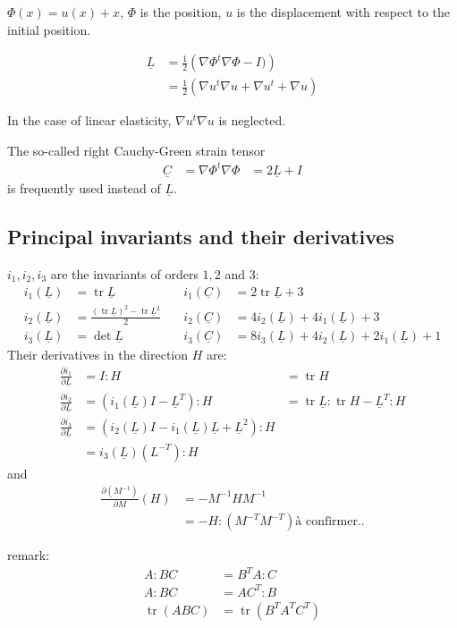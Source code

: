 \documentclass{article}
\newcommand{\TL}{\ensuremath{\underline{L}}}
\newcommand{\TC}{\ensuremath{\underline{C}}}
\newcommand{\DU}{\ensuremath{\nabla u}}
\newcommand{\DUt}{\ensuremath{\nabla u^t}}
\DeclareMathOperator{\Det}{det}
\DeclareMathOperator{\Trace}{tr}
\begin{document}
$\Phi(x) = u(x) + x$, $\Phi$ is the position, $u$ is the displacement with respect to the initial position.

\begin{align}
\TL &= \frac{1}{2}\left(\nabla\Phi^t\nabla\Phi - I)\right)\\
&= \frac{1}{2}\left(\DUt\DU + \DUt + \DU\right)
\end{align}

In the case of linear elasticity, $\DUt\DU$ is neglected.

The so-called right Cauchy-Green strain tensor
\begin{align}
\TC &= \nabla\Phi^t\nabla\Phi &= 2\TL + I
\end{align}
is frequently used instead of $\TL$.

\subsection{Principal invariants and their derivatives}
$i_1,i_2,i_3$ are the invariants of orders $1,2$ and $3$:
\begin{align}
  i_1(\TL) &= \Trace\TL &i_1(\TC) &= 2\Trace\TL + 3\\
  i_2(\TL) &= \frac{(\Trace\TL)^2 - \Trace\TL^2}{2}\quad& i_2(\TC)&=4i_2(\TL)+4i_1(\TL)+3\\
  i_3(\TL) &= \Det\TL &i_3(\TC) &= 8i_3(\TL) + 4i_2(\TL) + 2i_1(\TL) + 1
\end{align}
Their derivatives in the direction $H$ are:
\begin{align}
  \frac{\partial i_1}{\partial\TL} &= I:H &= \Trace H\\
  \frac{\partial i_2}{\partial\TL} &= (i_1(\TL)I - \TL^T):H &= \Trace \TL:\Trace H - \TL^T:H\\
  \frac{\partial i_3}{\partial\TL} &= (i_2(\TL)I - i_1(\TL)\TL + \TL^2):H \\
                  &= i_3(\TL)(L^{-T}):H
\end{align}
and
\begin{align}
\frac{\partial (M^{-1})}{\partial M}(H) &= -M^{-1}HM^{-1}\\
 &= -H:(M^{-T}M^{-T}) \textrm{\`a confirmer..}
\end{align}

remark:
\begin{align}
  A:BC &= B^TA:C\\
  A:BC &= AC^T:B\\
  \Trace(ABC) &= \Trace(B^TA^TC^T)
\end{align}
\end{document}
